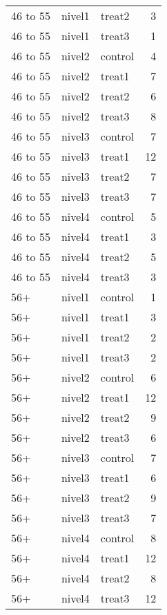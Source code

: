 \begin{tabular}{lllr}
  46 to 55 & nivel1 & treat2 &   3 \\ 
  46 to 55 & nivel1 & treat3 &   1 \\ 
  46 to 55 & nivel2 & control &   4 \\ 
  46 to 55 & nivel2 & treat1 &   7 \\ 
  46 to 55 & nivel2 & treat2 &   6 \\ 
  46 to 55 & nivel2 & treat3 &   8 \\ 
  46 to 55 & nivel3 & control &   7 \\ 
  46 to 55 & nivel3 & treat1 &  12 \\ 
  46 to 55 & nivel3 & treat2 &   7 \\ 
  46 to 55 & nivel3 & treat3 &   7 \\ 
  46 to 55 & nivel4 & control &   5 \\ 
  46 to 55 & nivel4 & treat1 &   3 \\ 
  46 to 55 & nivel4 & treat2 &   5 \\ 
  46 to 55 & nivel4 & treat3 &   3 \\ 
  56+ & nivel1 & control &   1 \\ 
  56+ & nivel1 & treat1 &   3 \\ 
  56+ & nivel1 & treat2 &   2 \\ 
  56+ & nivel1 & treat3 &   2 \\ 
  56+ & nivel2 & control &   6 \\ 
  56+ & nivel2 & treat1 &  12 \\ 
  56+ & nivel2 & treat2 &   9 \\ 
  56+ & nivel2 & treat3 &   6 \\ 
  56+ & nivel3 & control &   7 \\ 
  56+ & nivel3 & treat1 &   6 \\ 
  56+ & nivel3 & treat2 &   9 \\ 
  56+ & nivel3 & treat3 &   7 \\ 
  56+ & nivel4 & control &   8 \\ 
  56+ & nivel4 & treat1 &  12 \\ 
  56+ & nivel4 & treat2 &   8 \\ 
  56+ & nivel4 & treat3 &  12 \\ 
   \hline
\end{tabular}
